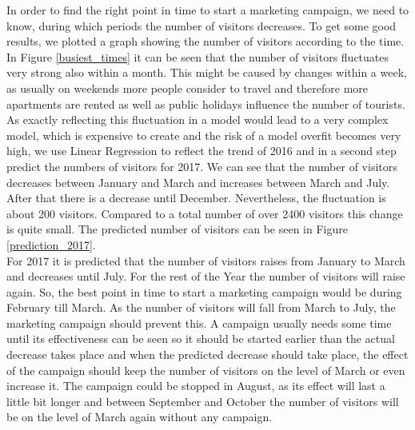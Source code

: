 \documentclass[journal]{IEEEtran}
\begin{document}
\noindent In order to find the right point in time to start a marketing campaign, we need to know, during which periods the number of visitors decreases. To get some good results, we plotted a graph showing the number of visitors according to the time.\\ In Figure \ref{busiest_times} it can be seen that the number of visitors fluctuates very strong also within a month. This might be caused by changes within a week, as usually on weekends more people consider to travel and therefore more apartments are rented as well as public holidays influence the number of tourists. As exactly reflecting this fluctuation in a model would lead to a very complex model, which is expensive to create and the risk of a model overfit becomes very high, we use Linear Regression to reflect the trend of 2016 and in a second step predict the numbers of visitors for 2017. We can see that the number of visitors decreases between January and March and increases between March and July. After that there is a decrease until December. Nevertheless, the fluctuation is about 200 visitors. Compared to a total number of over 2400 visitors this change is quite small.
The predicted number of visitors can be seen in Figure \ref{prediction_2017}.\\ For 2017 it is predicted that the number of visitors raises from January to March and decreases until July. For the rest of the Year the number of visitors will raise again. So, the best point in time to start a marketing campaign would be during February till March. As the number of visitors will fall from March to July, the marketing campaign should prevent this. A campaign usually needs some time until its effectiveness can be seen so it should be started earlier than the actual decrease takes place and when the predicted decrease should take place, the effect of the campaign should keep the number of visitors on the level of March or even increase it. The campaign could be stopped in August, as its effect will last a little bit longer and between September and October the number of visitors will be on the level of March again without any campaign.

%
\end{document}
